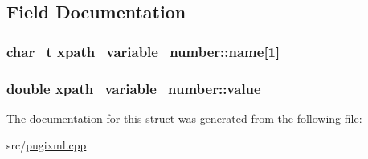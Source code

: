 \subsection{Field Documentation}
\hypertarget{structxpath__variable__number_a2bf4163dab1a8e233d45677fee987f0f}{
\subsubsection[{name}]{\setlength{\rightskip}{0pt plus 5cm}char\_\-t {\bf xpath\_\-variable\_\-number::name}\mbox{[}1\mbox{]}}}
\label{structxpath__variable__number_a2bf4163dab1a8e233d45677fee987f0f}
\hypertarget{structxpath__variable__number_a49949397348e7c941d88a694ec5c8e57}{
\subsubsection[{value}]{\setlength{\rightskip}{0pt plus 5cm}double {\bf xpath\_\-variable\_\-number::value}}}
\label{structxpath__variable__number_a49949397348e7c941d88a694ec5c8e57}


The documentation for this struct was generated from the following file:\begin{DoxyCompactItemize}
\item 
src/\hyperlink{pugixml_8cpp}{pugixml.cpp}\end{DoxyCompactItemize}
